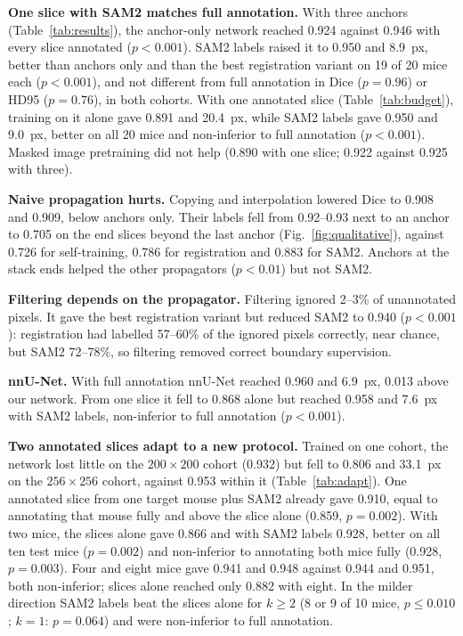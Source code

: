 \textbf{One slice with SAM2 matches full annotation.} With three anchors (Table~\ref{tab:results}), the anchor-only network reached 0.924 against 0.946 with every slice annotated ($p<0.001$). SAM2 labels raised it to 0.950 and 8.9~px, better than anchors only and than the best registration variant on 19 of 20 mice each ($p<0.001$), and not different from full annotation in Dice ($p=0.96$) or HD95 ($p=0.76$), in both cohorts. With one annotated slice (Table~\ref{tab:budget}), training on it alone gave 0.891 and 20.4~px, while SAM2 labels gave 0.950 and 9.0~px, better on all 20 mice and non-inferior to full annotation ($p<0.001$). Masked image pretraining did not help (0.890 with one slice; 0.922 against 0.925 with three).

\textbf{Naive propagation hurts.} Copying and interpolation lowered Dice to 0.908 and 0.909, below anchors only. Their labels fell from 0.92--0.93 next to an anchor to 0.705 on the end slices beyond the last anchor (Fig.~\ref{fig:qualitative}), against 0.726 for self-training, 0.786 for registration and 0.883 for SAM2. Anchors at the stack ends helped the other propagators ($p<0.01$) but not SAM2.

\textbf{Filtering depends on the propagator.} Filtering ignored 2--3\% of unannotated pixels. It gave the best registration variant but reduced SAM2 to 0.940 ($p<0.001$): registration had labelled 57--60\% of the ignored pixels correctly, near chance, but SAM2 72--78\%, so filtering removed correct boundary supervision.

\textbf{nnU-Net.} With full annotation nnU-Net reached 0.960 and 6.9~px, 0.013 above our network. From one slice it fell to 0.868 alone but reached 0.958 and 7.6~px with SAM2 labels, non-inferior to full annotation ($p<0.001$).

\textbf{Two annotated slices adapt to a new protocol.} Trained on one cohort, the network lost little on the $200\times200$ cohort (0.932) but fell to 0.806 and 33.1~px on the $256\times256$ cohort, against 0.953 within it (Table~\ref{tab:adapt}). One annotated slice from one target mouse plus SAM2 already gave 0.910, equal to annotating that mouse fully and above the slice alone (0.859, $p=0.002$). With two mice, the slices alone gave 0.866 and with SAM2 labels 0.928, better on all ten test mice ($p=0.002$) and non-inferior to annotating both mice fully (0.928, $p=0.003$). Four and eight mice gave 0.941 and 0.948 against 0.944 and 0.951, both non-inferior; slices alone reached only 0.882 with eight. In the milder direction SAM2 labels beat the slices alone for $k\ge2$ (8 or 9 of 10 mice, $p\le0.010$; $k=1$: $p=0.064$) and were non-inferior to full annotation.

